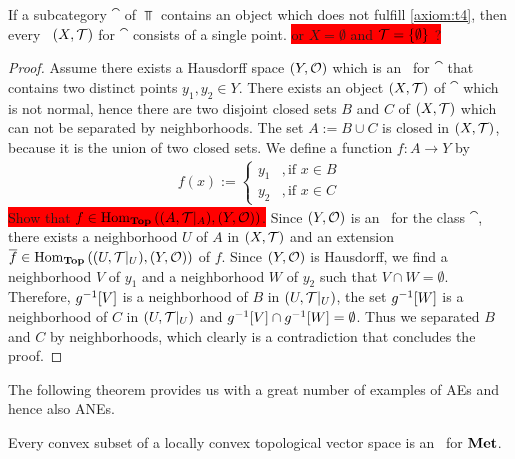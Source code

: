 \begin{proposition}
	If a subcategory $\cat$ of $\Top$ contains an object which does not fulfill \ref{axiom:t4}, then every \ane\ $\tspace$ for $\cat$ consists  of a single point. \colorbox{red}{or $X = \emptyset$ and $\mathcal{T} = {\left \{ \emptyset \right \}}$ ?}
\end{proposition}
\begin{proof}
	Assume there exists a Hausdorff space $\tspace[Y][O]$ which is an \ane\ for $\cat$ that contains two distinct points $y_1, y_2 \in Y$. There exists an object $\tspace$ of $\cat$ which is not normal, hence there are two disjoint closed sets $B$ and $C$ of $\tspace$ which can not be separated by neighborhoods. The set $A := B \cup C$ is closed in $\tspace$, because it is the union of two closed sets. We define a function $f: A \to Y$ by
	\begin{align*}
		f(x) := 
		\begin{cases}
			y_1 &, \text{if } x \in B \\
			y_2 &, \text{if } x \in C
		\end{cases}
	\end{align*} 
	\colorbox{red}{Show that $f \in \Hom_\Top\pbraces{\reltspace, \tspace[Y][O]}$.} Since $\tspace[Y][O]$ is an \ane\ for the class $\cat$, there exists a neighborhood $U$ of $A$ in $\tspace$ and an extension $\overline{f} \in \Hom_\Top\pbraces{\reltspace[U], \tspace[Y][O]}$ of $f$. Since $\tspace[Y][O]$ is Hausdorff, we find a neighborhood $V$ of $y_1$ and a neighborhood $W$ of $y_2$ such that $V \cap W = \emptyset$. Therefore, $g^{-1}{\left [ V \right ]}$ is a neighborhood of $B$ in $\reltspace[U]$, the set $g^{-1}{\left [ W \right ]}$ is a neighborhood of $C$ in $\reltspace[U]$ and $g^{-1}{\left [ V \right ]} \cap g^{-1}{\left [ W \right ]} = \emptyset$. Thus we separated $B$ and $C$ by neighborhoods, which clearly is a contradiction that concludes the proof. 
\end{proof}

The following theorem provides us with a great number of examples of AEs and hence also ANEs. 

\begin{theorem}
	Every convex subset of a locally convex topological vector space is an \aex\ for $\mathbf{Met}$.
\end{theorem}

